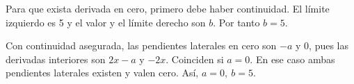 Para que exista derivada en cero, primero debe haber
continuidad. El límite izquierdo es 5 y el valor y el límite
derecho son $b$. Por tanto $b=5$.

Con continuidad asegurada, las pendientes laterales en cero
son $-a$ y $0$, pues las derivadas interiores son $2x-a$
y $-2x$. Coinciden si $a=0$. En ese caso ambas pendientes
laterales existen y valen cero. Así, $\boxed{a=0,\ b=5}$.
